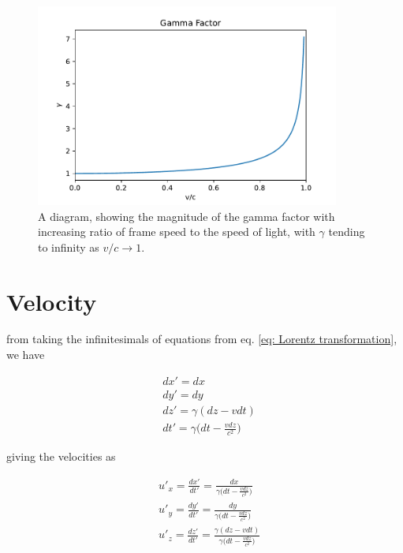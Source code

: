 \begin{figure}[H]
	\centering
	\includegraphics[width=10cm]{images/pdf/Gamma_Factor.pdf}
	\caption{A diagram, showing the magnitude of the gamma factor with increasing ratio of frame speed to the speed of light, with $\gamma$ tending to infinity as $v/c\rightarrow 1$.}
	\label{fig: Gamma Factor}
\end{figure}

\section{Velocity}

from taking the infinitesimals of equations from eq. \eqref{eq: Lorentz transformation}, we have

\begin{equation}
	\begin{aligned}
		 & dx'=dx                                    \\
		 & dy'=dy                                    \\
		 & dz' = \gamma (dz-vdt)                     \\
		 & dt'=\gamma \bigg(dt-\frac{vdz}{c^2}\bigg)
	\end{aligned}
\end{equation}

giving the velocities as

\begin{equation}
	\begin{aligned}
		 & u'_x = \frac{dx'}{dt'}=\frac{dx}{\gamma \bigg(dt-\frac{vdz}{c^2}\bigg) }                \\
		 & u'_y = \frac{dy'}{dt'}=\frac{dy}{\gamma \bigg(dt-\frac{vdz}{c^2}\bigg) }                \\
		 & u'_z = \frac{dz'}{dt'} = \frac{\gamma (dz-vdt)}{\gamma \bigg(dt-\frac{vdz}{c^2}\bigg) }
	\end{aligned}
\end{equation}

